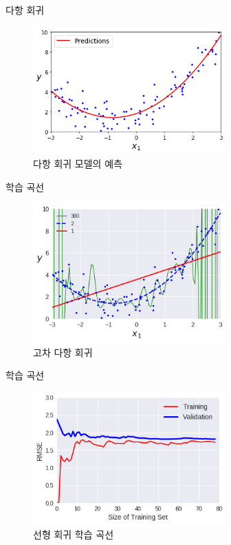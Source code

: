 \documentclass{beamer}
\numberwithin{equation}{section}
\begin{document}

\begin{frame}{다항 회귀}

\begin{figure}
\includegraphics[width=20em]{./images/polynomial_regression}
\caption{\label{fig:polynomial_regression}다항 회귀 모델의 예측}
\end{figure}

\end{frame}


\begin{frame}{학습 곡선}

\begin{figure}
\includegraphics[width=20em]{./images/compare_polynomial_regression}
\caption{\label{fig:compare_polynomial_regression}고차 다항 회귀}
\end{figure}

\end{frame}


\begin{frame}{학습 곡선}

\begin{figure}
\includegraphics[width=20em]{./images/learning_curve_linear_regression}
\caption{\label{fig:learning_curve_linear_regression}선형 회귀 학습 곡선}
\end{figure}

\end{frame}
\end{document}
